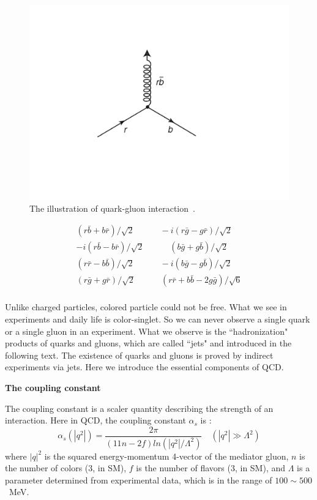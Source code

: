 \begin{figure}[htb]
\centering
\includegraphics[width=.7\textwidth]{figures/rbcolor.png}
\caption{The illustration of quark-gluon interaction~\cite{particlebook1}.}
\label{fig:color_rb}
\end{figure}  

\begin{equation}
\begin{split}
(r\bar{b} + b\bar{r})/\sqrt{2}  \quad \quad \quad -i(r\bar{g}-g\bar{r})/\sqrt{2} \\
-i(r\bar{b}-b\bar{r})/\sqrt{2}   \quad \quad  \quad  (b\bar{g} + g\bar{b})/\sqrt{2} \\
(r\bar{r} - b\bar{b})/\sqrt{2}   \quad \quad  \quad  -i(b\bar{g} - g\bar{b})/\sqrt{2} \\
(r\bar{g} + g\bar{r})/\sqrt{2}   \quad \quad   \quad (r\bar{r} + b\bar{b} -2g\bar{g})/\sqrt{6} \\
\end{split}
\label{eq:8colors}
\end{equation}


Unlike charged particles, colored particle could not be free. What we see in experiments and daily life is 
color-singlet. So we can never observe a single quark or a single gluon 
in an experiment. 
What we observe is the ``hadronization" products of quarks and gluons, which are
called ``jets" and introduced in the following text. The existence of quarks and gluons is proved by indirect experiments via jets. 
Here we introduce the essential components of QCD. 

{\bf The coupling constant}

The coupling constant is a scaler quantity describing the strength of an interaction. 
Here in QCD, the coupling constant $\alpha_{s}$ is :
\begin{equation}
\alpha_{s}(|q^2|) = \frac{2\pi}{(11n-2f)ln(|q^2|/\Lambda^2)}   \quad (|q^2| \gg \Lambda^2)
\label{equation:coupling}
\end{equation}
where  $|q|^2$ is the squared energy-momentum 4-vector of the mediator gluon, $n$ is the number of colors (3, in SM), 
$f$ is the number of flavors (3, in SM), and $\Lambda$ is a parameter determined from 
experimental data, which is in the range of $100 {\sim} 500$~MeV. 

